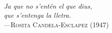 \documentclass[12pt,twoside,openright]{book} %
\makeatletter
\def \cleardoublepage {\clearpage \if@twoside
\ifodd \c@page
\else
\null\thispagestyle{empty}\clearpage
\fi
\fi}
\makeatother
\begin{document}
\sloppy	%


\frontmatter %





\cleardoublepage
\vspace*{4cm} 
\hspace*{200pt} \\
\hspace*{165pt} \textit{Ja que no s'entén el que dius,} \\
\hspace*{165pt} \textit{que s'entenga la lletra.} \\
\hspace*{170pt} ---\textsc{Rosita Candela-Esclapez (1947)} \\
\vspace*{4cm} 
\cleardoublepage




\hypersetup{urlcolor=black}
\fancyfoot[C]{\thepage}
%
\hypersetup{urlcolor=blue}
\end{document}
